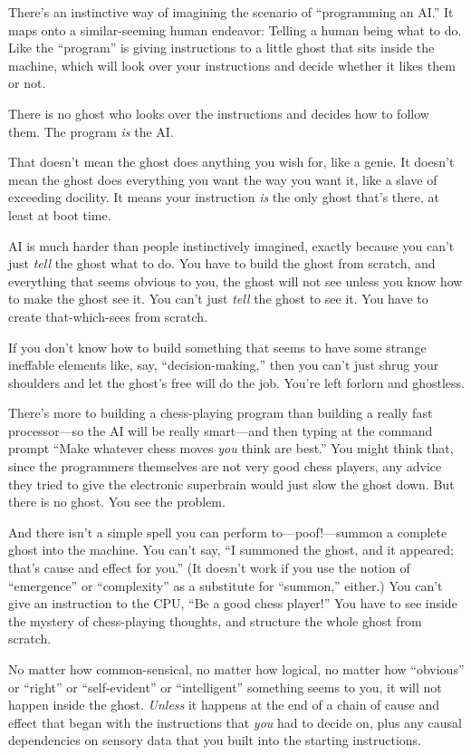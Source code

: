 {
 There's an instinctive way of imagining the
scenario of ``programming an AI.''
It maps onto a similar-seeming human endeavor: Telling a human being
what to do. Like the ``program'' is
giving instructions to a little ghost that sits inside the machine,
which will look over your instructions and decide whether it likes them
or not.}

{
 There is no ghost who looks over the instructions and decides how
to follow them. The program \textit{is} the AI.}

{
 That doesn't mean the ghost does anything you wish
for, like a genie. It doesn't mean the ghost does
everything you want the way you want it, like a slave of exceeding
docility. It means your instruction \textit{is} the only ghost
that's there, at least at boot time.}

{
 AI is much harder than people instinctively imagined, exactly
because you can't just \textit{tell} the ghost what to
do. You have to build the ghost from scratch, and everything that seems
obvious to you, the ghost will not see unless you know how to make the
ghost see it. You can't just \textit{tell} the ghost to
see it. You have to create that-which-sees from scratch.}

{
 If you don't know how to build something that
seems to have some strange ineffable elements like, say,
``decision-making,'' then you
can't just shrug your shoulders and let the
ghost's free will do the job. You're
left forlorn and ghostless.}

{
 There's more to building a chess-playing program
than building a really fast processor---so the AI will be really
smart---and then typing at the command prompt ``Make
whatever chess moves \textit{you} think are best.''
You might think that, since the programmers themselves are not very
good chess players, any advice they tried to give the electronic
superbrain would just slow the ghost down. But there is no ghost. You
see the problem.}

{
 And there isn't a simple spell you can perform
to---poof!---summon a complete ghost into the machine. You
can't say, ``I summoned the ghost, and
it appeared; that's cause and effect for
you.'' (It doesn't work if you use
the notion of ``emergence'' or
``complexity'' as a substitute for
``summon,'' either.) You
can't give an instruction to the CPU,
``Be a good chess player!'' You have
to see inside the mystery of chess-playing thoughts, and structure the
whole ghost from scratch.}

{
 No matter how common-sensical, no matter how logical, no matter
how ``obvious'' or
``right'' or
``self-evident'' or
``intelligent'' something seems to
you, it will not happen inside the ghost. \textit{Unless} it happens at
the end of a chain of cause and effect that began with the instructions
that \textit{you} had to decide on, plus any causal dependencies on
sensory data that you built into the starting instructions.}

